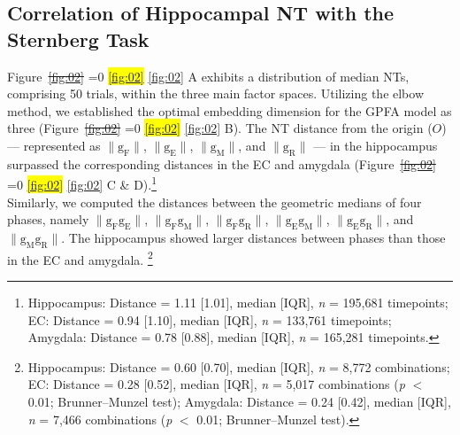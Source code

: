 \documentclass[preprint,review,12pt]{elsarticle}%
\newcommand{\hl}[1]{\colorbox{yellow}{#1}} %
\newcommand{\hlref}[1]{%
  \ifnum\getrefnumber{#1}=0 %
    \hl{\ref*{#1}}%
  \else %
    \ref{#1}%
  \fi %
} %
\providecommand{\DIFdeltex}[1]{{\protect\color{red}\sout{#1}}}                      %
\providecommand{\DIFaddbegin}{} %
\providecommand{\DIFaddend}{} %
\providecommand{\DIFdelbegin}{} %
\providecommand{\DIFdelend}{} %
\providecommand{\DIFdel}[1]{\texorpdfstring{\DIFdeltex{#1}}{}} %
\newcommand{\DIFscaledelfig}{0.5}
\newlength{\DIFdelgraphicswidth} %
\newlength{\DIFdelgraphicsheight} %
\newcommand{\DIFaddincludegraphics}[2][]{{\color{blue}\fbox{\DIFOincludegraphics[#1]{#2}}}} %
\newcommand{\DIFdelincludegraphics}[2][]{%
\sbox{\DIFdelgraphicsbox}{\DIFOincludegraphics[#1]{#2}}%
\settoboxwidth{\DIFdelgraphicswidth}{\DIFdelgraphicsbox} %
\settoboxtotalheight{\DIFdelgraphicsheight}{\DIFdelgraphicsbox} %
\scalebox{\DIFscaledelfig}{%
\parbox[b]{\DIFdelgraphicswidth}{\usebox{\DIFdelgraphicsbox}\\[-\baselineskip] \rule{\DIFdelgraphicswidth}{0em}}\llap{\resizebox{\DIFdelgraphicswidth}{\DIFdelgraphicsheight}{%
\setlength{\unitlength}{\DIFdelgraphicswidth}%
\begin{picture}(1,1)%
\thicklines\linethickness{2pt} %
{\color[rgb]{1,0,0}\put(0,0){\framebox(1,1){}}}%
{\color[rgb]{1,0,0}\put(0,0){\line( 1,1){1}}}%
{\color[rgb]{1,0,0}\put(0,1){\line(1,-1){1}}}%
\end{picture}%
}\hspace*{3pt}}} %
} %
\DeclareRobustCommand{\DIFaddbegin}{\DIFOaddbegin \let\includegraphics\DIFaddincludegraphics} %
\DeclareRobustCommand{\DIFaddend}{\DIFOaddend \let\includegraphics\DIFOincludegraphics} %
\DeclareRobustCommand{\DIFdelbegin}{\DIFOdelbegin \let\includegraphics\DIFdelincludegraphics} %
\DeclareRobustCommand{\DIFdelend}{\DIFOaddend \let\includegraphics\DIFOincludegraphics} %
\begin{document}
\subsection{Correlation of Hippocampal NT with the Sternberg Task}
Figure~\DIFdelbegin \DIFdel{\ref{fig:02}}\DIFdelend \DIFaddbegin \hlref{fig:02}\DIFaddend A exhibits a distribution of median NTs, comprising 50 trials, within the three main factor spaces. Utilizing the elbow method, we established the optimal embedding dimension for the GPFA model as three (Figure~\DIFdelbegin \DIFdel{\ref{fig:02}}\DIFdelend \DIFaddbegin \hlref{fig:02}\DIFaddend B). The NT distance from the origin ($O$) --- represented as $\mathrm{\lVert g_{F} \rVert}$, $\mathrm{\lVert g_{E} \rVert}$, $\mathrm{\lVert g_{M} \rVert}$, and $\mathrm{\lVert g_{R} \rVert}$ --- in the hippocampus surpassed the corresponding distances in the EC and amygdala (Figure~\DIFdelbegin \DIFdel{\ref{fig:02}}\DIFdelend \DIFaddbegin \hlref{fig:02}\DIFaddend C \& D).\footnote{Hippocampus: Distance = 1.11 [1.01], median [IQR], \textit{n} = 195,681 timepoints; EC: Distance = 0.94 [1.10], median [IQR], \textit{n} = 133,761 timepoints; Amygdala: Distance = 0.78 [0.88], median [IQR], \textit{n} = 165,281 timepoints.}
\\
\indent
Similarly, we computed the distances between the geometric medians of four phases, namely $\mathrm{\lVert g_{F}g_{E} \rVert}$, $\mathrm{\lVert g_{F}g_{M} \rVert}$, $\mathrm{\lVert g_{F}g_{R} \rVert}$, $\mathrm{\lVert g_{E}g_{M} \rVert}$, $\mathrm{\lVert g_{E}g_{R} \rVert}$, and $\mathrm{\lVert g_{M}g_{R} \rVert}$. The hippocampus showed larger distances between phases than those in the EC and amygdala. \footnote{Hippocampus: Distance = 0.60 [0.70], median [IQR], \textit{n} = 8,772 combinations; EC: Distance = 0.28 [0.52], median [IQR], \textit{n} = 5,017 combinations (\textit{p} $<$ 0.01; Brunner--Munzel test); Amygdala: Distance = 0.24 [0.42], median [IQR], \textit{n} = 7,466 combinations (\textit{p} $<$ 0.01; Brunner--Munzel test).}
\end{document}
